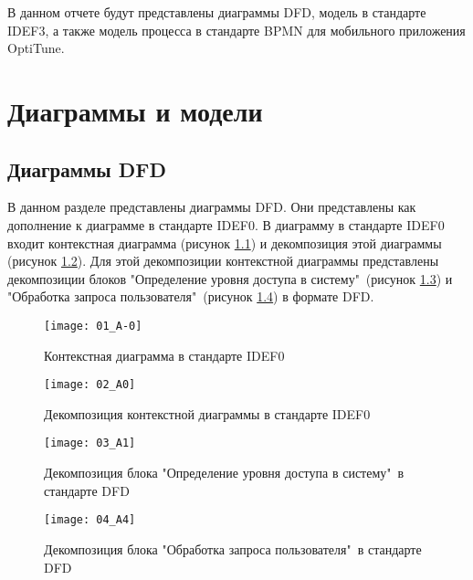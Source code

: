 \documentclass[14pt]{extreport}
\begin{document}
\pagestyle{empty} 


\pagestyle{plain}
\tableofcontents
 

\intro 

В данном отчете будут представлены диаграммы DFD, модель в стандарте IDEF3, а также модель процесса в стандарте BPMN для мобильного приложения OptiTune.


\chapter{Диаграммы и модели\label{chapter1}}
\section{Диаграммы DFD}

В данном разделе представлены диаграммы DFD. Они представлены как дополнение к диаграмме в стандарте IDEF0. В диаграмму в стандарте IDEF0 входит контекстная диаграмма  (рисунок \ref{fig1}) и декомпозиция этой диаграммы  (рисунок \ref{fig2}). Для этой декомпозиции контекстной диаграммы представлены  декомпозиции блоков "Определение уровня доступа в систему"\ (рисунок \ref{fig3}) и "Обработка запроса пользователя"\ (рисунок \ref{fig4}) в формате DFD.

\begin{landscape}
\begin{figure}[H]
\centerline{\texttt{[image: 01\_A-0]}}
\caption{Контекстная диаграмма в стандарте IDEF0}
\label{fig1}
\end{figure}

\begin{figure}[H]
\centerline{\texttt{[image: 02\_A0]}}
\caption{Декомпозиция контекстной диаграммы в стандарте IDEF0}
\label{fig2}
\end{figure}

\begin{figure}[H]
\centerline{\texttt{[image: 03\_A1]}}
\caption{Декомпозиция блока "Определение уровня доступа в систему"\ в стандарте DFD}
\label{fig3}
\end{figure}

\begin{figure}[H]
\centerline{\texttt{[image: 04\_A4]}}
\caption{Декомпозиция блока "Обработка запроса пользователя"\ в стандарте DFD}
\label{fig4}
\end{figure}
\end{landscape}
\end{document}

